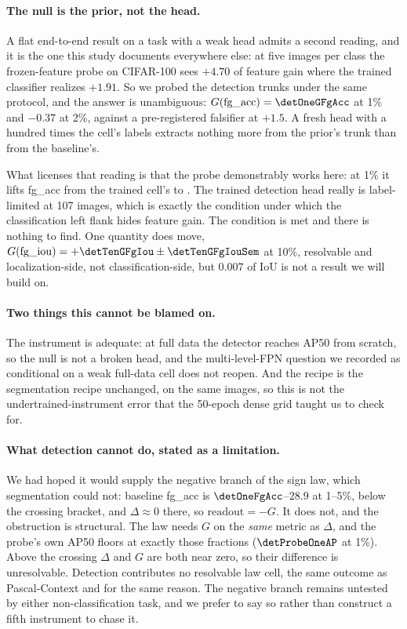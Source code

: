 \paragraph{The null is the prior, not the head.} A flat end-to-end result on a
task with a weak head admits a second reading, and it is the one this study
documents everywhere else: at five images per class the frozen-feature probe on
CIFAR-100 sees $+4.70$ of feature gain where the trained classifier realizes
$+1.91$. So we probed the detection trunks under the same protocol, and the
answer is unambiguous: $G(\mathrm{fg\_acc}) = \detOneGFgAcc$ at 1\% and $-0.37$
at 2\%, against a pre-registered falsifier at $+1.5$. A fresh head with a
hundred times the cell's labels extracts nothing more from the prior's trunk
than from the baseline's.

What licenses that reading is that the probe demonstrably works here: at 1\% it
lifts fg\_acc from the trained cell's \detOneFgAcc{} to \detProbeLiftOne. The
trained detection head really is label-limited at 107 images, which is exactly
the condition under which the classification left flank hides feature gain. The
condition is met and there is nothing to find. One quantity does move,
$G(\mathrm{fg\_iou}) = +\detTenGFgIou \pm \detTenGFgIouSem$ at 10\%, resolvable and localization-side, not classification-side, but $0.007$ of IoU is
not a result we will build on.

\paragraph{Two things this cannot be blamed on.} The instrument is adequate: at
full data the detector reaches \detFullAPnone{} AP50 from scratch, so the null
is not a broken head, and the multi-level-FPN question we recorded as
conditional on a weak full-data cell does not reopen. And the recipe is the
segmentation recipe unchanged, on the same images, so this is not the
undertrained-instrument error that the 50-epoch dense grid taught us to check
for.

\paragraph{What detection cannot do, stated as a limitation.} We had hoped it
would supply the negative branch of the sign law, which segmentation could not:
baseline fg\_acc is $\detOneFgAcc$--$28.9$ at 1--5\%, below the crossing
bracket, and $\Delta \approx 0$ there, so $\mathrm{readout} = -G$. It does not,
and the obstruction is structural. The law needs $G$ on the \emph{same} metric
as $\Delta$, and the probe's own AP50 floors at exactly those fractions
($\detProbeOneAP$ at 1\%). Above the crossing $\Delta$ and $G$ are both near
zero, so their difference is unresolvable. Detection contributes no resolvable
law cell, the same outcome as Pascal-Context and for the same reason. The
negative branch remains untested by either non-classification task, and we
prefer to say so rather than construct a fifth instrument to chase it.

